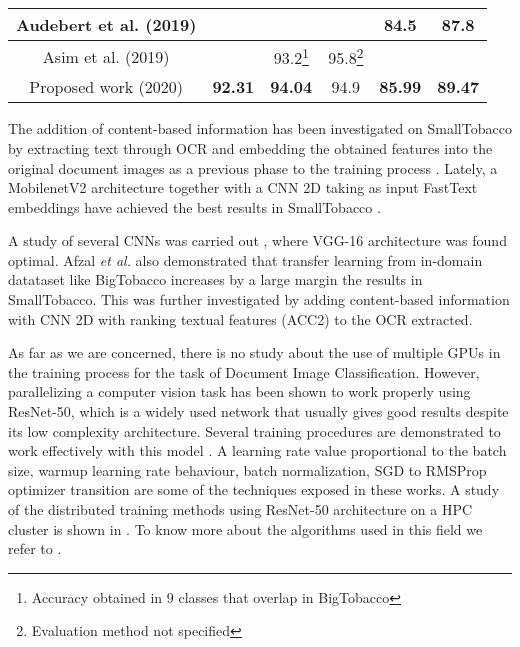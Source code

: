 \documentclass[runningheads]{llncs}
\begin{document}
\begin{table}
{\begin{tabular}{c|c|c|c|c|c|}
\multicolumn{1}{|c|}{Audebert et al. (2019)\cite{multimodal}}  &                     &                        &                     & 84.5                 & 87.8              \\ \hline
\multicolumn{1}{|c|}{Asim et al. (2019)\cite{stream}}      &                     & 93.2\footnote{Accuracy obtained in 9 classes that overlap in BigTobacco}                    & 95.8\footnote{Evaluation method not specified}             &                      &                   \\ \hline
\multicolumn{1}{|c|}{Proposed work (2020)}    & \textbf{92.31}      & \textbf{94.04}         &         94.9            & \textbf{85.99} & \textbf{89.47} \\ \hline
\end{tabular}}
\label{Related_work}
\end{table}

The addition of content-based information has been investigated on SmallTobacco by extracting text through OCR and embedding the obtained features into the original document images as a previous phase to the training process \cite{noce}. Lately, a MobilenetV2 architecture \cite{mobilenetv2} together with a CNN 2D \cite{cnn2d,wallace} taking as input FastText embeddings \cite{fast_text1,fast_text2} have achieved the best results in SmallTobacco \cite{multimodal}.

A study of several CNNs was carried out \cite{cutting_error}, where VGG-16 architecture was found optimal. Afzal \textit{et al.} also demonstrated that transfer learning from in-domain datataset like BigTobacco increases by a large margin the results in SmallTobacco. This was further investigated by adding content-based information with CNN 2D with ranking textual features (ACC2) to the OCR extracted.

As far as we are concerned, there is no study about the use of multiple GPUs in the training process for the task of Document Image Classification. However, parallelizing a computer vision task has been shown to work properly using ResNet-50, which is a widely used network that usually gives good results despite its low complexity architecture. Several training procedures are demonstrated to work effectively with this model \cite{15_min,1_hour}. A learning rate value proportional to the batch size, warmup learning rate behaviour, batch normalization, SGD to RMSProp optimizer transition are some of the techniques exposed in these works. A study of the distributed training methods using ResNet-50 architecture on a HPC cluster is shown in \cite{campos1,campos2}. To know more about the algorithms used in this field we refer to \cite{distributed}.
\end{document}
